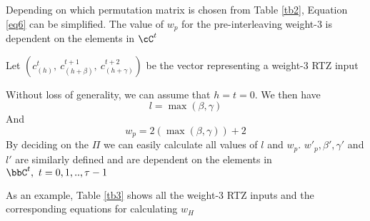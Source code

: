 Depending on which permutation matrix is chosen from Table \ref{tb2}, Equation \ref{eq6} can be simplified. 
The value of $w_p$ for the pre-interleaving weight-$3$ is dependent on the elements in $\cC^t$

Let $(c_{(h)}^{t},~c_{(h+\beta)}^{t+1},~c_{(h+\gamma)}^{t+2})$ be the vector representing a weight-$3$ RTZ input

Without loss of generality, we can assume that $h =t =0$. We then have 
\begin{equation}
l=\max{(\beta,\gamma)}
\label{eq8}
\end{equation}
And 
\begin{equation}
w_p=
2(\max{(\beta,\gamma)})+2
\label{eq9}
\end{equation}
By deciding on the $\Pi$ we can easily calculate all values of $l$ and $w_p$. 
$w'_p,\beta',\gamma' $ and $l'$ are similarly defined and are dependent on the elements in $\bbC^{t},~t=0,1,..,\tau-1$

As an example, Table \ref{tb3} shows all the weight-$3$ RTZ inputs and the corresponding equations for calculating $w_H$

